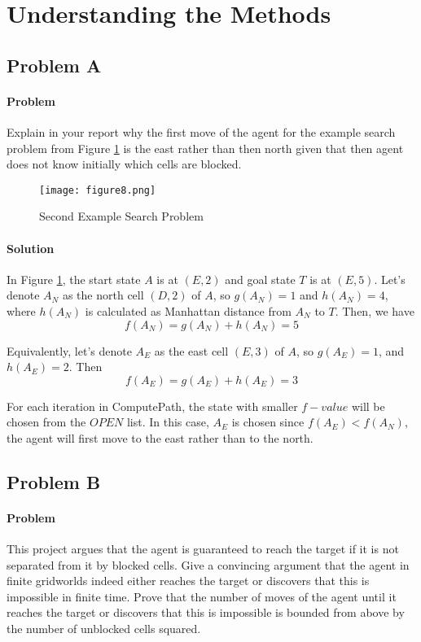 \section{Understanding the Methods}

\subsection{Problem A} 

\paragraph{Problem}
Explain in your report why the first move of the agent for the example search
problem from Figure \ref{fig:figure8} is the east rather than then north given
that then agent does not know initially which cells are blocked.

\begin{figure}[h!]
  \centering
  \texttt{[image: figure8.png]}
  \caption{Second Example Search Problem}
  \label{fig:figure8}
\end{figure}

\paragraph{Solution}
In Figure \ref{fig:figure8}, the start state $A$ is at $(E,2)$ and goal state
$T$ is at $(E,5)$. Let's denote $A_N$ as the north cell $(D,2)$ of $A$, so
$g(A_N)=1$ and $h(A_N)=4$, where $h(A_N)$ is calculated as Manhattan distance
from $A_N$ to $T$. Then, we have
\begin{equation*}
  f(A_N) = g(A_N) + h(A_N) = 5 
\end{equation*}

Equivalently, let's denote $A_E$ as the east cell $(E,3)$ of $A$, so
$g(A_E)=1$, and $h(A_E)=2$. Then
\begin{equation*}
  f(A_E) = g(A_E) + h(A_E) = 3
\end{equation*}

For each iteration in ComputePath, the state with smaller $f-value$ will be
chosen from the $OPEN$ list. In this case, $A_E$ is chosen since
$f(A_E)<f(A_N)$, the agent will first move to the east rather than to the
north.

\subsection{Problem B}

\paragraph{Problem}
This project argues that the agent is guaranteed to reach the target if it is
not separated from it by blocked cells. Give a convincing argument that the
agent in finite gridworlds indeed either reaches the target or discovers that
this is impossible in finite time. Prove that the number of moves of the agent
until it reaches the target or discovers that this is impossible is bounded
from above by the number of unblocked cells squared.

